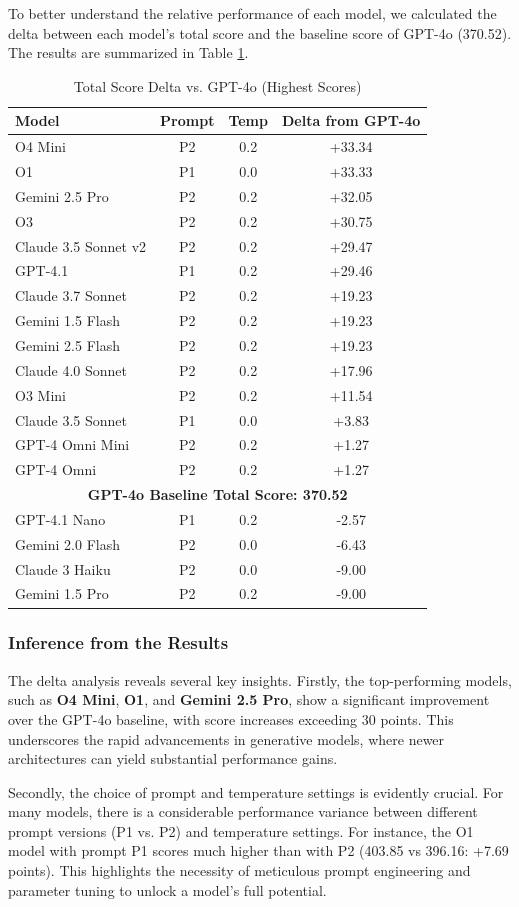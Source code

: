 To better understand the relative performance of each model, we calculated the delta between each model's total score and the baseline score of GPT-4o (370.52). The results are summarized in Table \ref{tab:deepeval_delta_results}.

\begin{table}[!htbp]
\centering
\small
\caption{Total Score Delta vs. GPT-4o (Highest Scores)}
\label{tab:deepeval_delta_results}
\begin{tabular}{|l|c|c|c|}
\hline
\textbf{Model} & \textbf{Prompt} & \textbf{Temp} & \textbf{Delta from GPT-4o} \\
\hline
O4 Mini & P2 & 0.2 & +33.34 \\
O1 & P1 & 0.0 & +33.33 \\
Gemini 2.5 Pro & P2 & 0.2 & +32.05 \\
O3 & P2 & 0.2 & +30.75 \\
Claude 3.5 Sonnet v2 & P2 & 0.2 & +29.47 \\
GPT-4.1 & P1 & 0.2 & +29.46 \\
Claude 3.7 Sonnet & P2 & 0.2 & +19.23 \\
Gemini 1.5 Flash & P2 & 0.2 & +19.23 \\
Gemini 2.5 Flash & P2 & 0.2 & +19.23 \\
Claude 4.0 Sonnet & P2 & 0.2 & +17.96 \\
O3 Mini & P2 & 0.2 & +11.54 \\
Claude 3.5 Sonnet & P1 & 0.0 & +3.83 \\
GPT-4 Omni Mini & P2 & 0.2 & +1.27 \\
GPT-4 Omni & P2 & 0.2 & +1.27 \\
\hline
\multicolumn{4}{|c|}{\textbf{GPT-4o Baseline Total Score: 370.52}} \\
\hline
GPT-4.1 Nano & P1 & 0.2 & -2.57 \\
Gemini 2.0 Flash & P2 & 0.0 & -6.43 \\
Claude 3 Haiku & P2 & 0.0 & -9.00 \\
Gemini 1.5 Pro & P2 & 0.2 & -9.00 \\
\hline
\end{tabular}
\end{table}

\subsubsection{Inference from the Results}
The delta analysis reveals several key insights. Firstly, the top-performing models, such as \textbf{O4 Mini}, \textbf{O1}, and \textbf{Gemini 2.5 Pro}, show a significant improvement over the GPT-4o baseline, with score increases exceeding 30 points. This underscores the rapid advancements in generative models, where newer architectures can yield substantial performance gains.

Secondly, the choice of prompt and temperature settings is evidently crucial. For many models, there is a considerable performance variance between different prompt versions (P1 vs. P2) and temperature settings. For instance, the O1 model with prompt P1 scores much higher than with P2 (403.85 vs 396.16: +7.69 points). This highlights the necessity of meticulous prompt engineering and parameter tuning to unlock a model's full potential.
